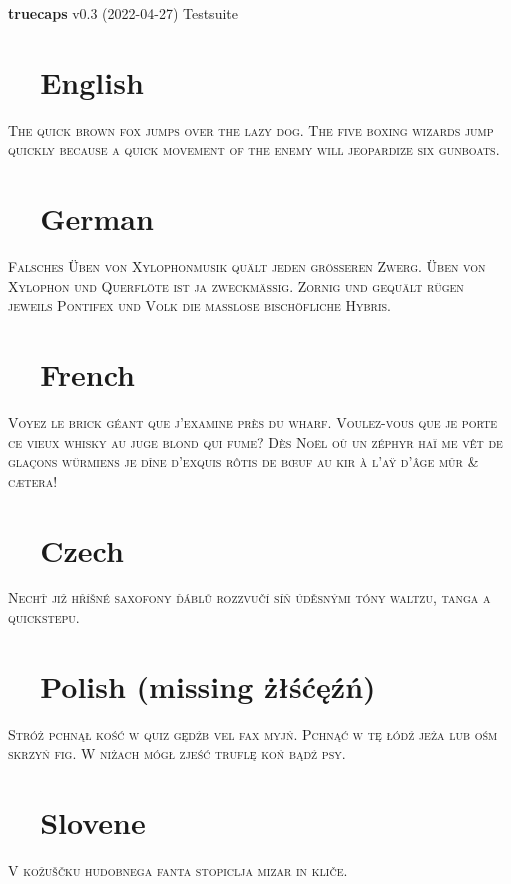 \documentclass{article}
\def\checkno	{\textcolor{red}{\textbf{\ding{55}~~}}}
\def\checkyes	{\textcolor{green}{\textbf{\ding{51}~~}}}
\begin{document}
\hfill{\Large \textbf{truecaps} v0.3 (2022-04-27) Testsuite}

\vspace{-1em}\section*{\checkyes English}
\textsc{The quick brown fox jumps over the lazy dog.
The five boxing wizards jump quickly because 
a quick movement of the enemy will jeopardize six gunboats.}

\vspace{-1em}\section*{\checkyes German}
\noindent\textsc{Falsches Üben von Xylophonmusik quält jeden größeren Zwerg.
Üben von Xylophon und Querflöte ist ja zweckmäßig. 
Zornig und gequält rügen jeweils Pontifex und Volk die maßlose bischöfliche Hybris.}

\vspace{-1em}\section*{\checkyes French}
\noindent\textsc{Voyez le brick géant que j’examine près du wharf.
Voulez-vous que je porte ce vieux whisky au juge blond qui fume\medspace?
Dès Noël où un zéphyr haï me vêt de glaçons würmiens 
je dîne d’exquis rôtis de bœuf au kir à l’aÿ d’âge mûr \& cætera\medspace!}

\vspace{-1em}\section*{\checkyes Czech}
\noindent\textsc{Nechť již hříšné saxofony ďáblů rozzvučí síň úděsnými 
tóny waltzu, tanga a quickstepu.}

\vspace{-1em}\section*{\checkno Polish (missing \string żłśćęźń)}
\noindent\textsc{
Stróż pchnął kość w quiz gędźb vel fax myjń. 
Pchnąć w tę łódź jeża lub ośm skrzyń fig.
W niżach mógł zjeść truflę koń bądź psy.
}

\vspace{-1em}\section*{\checkno Slovene}
\noindent\textsc{
V kožuščku hudobnega fanta stopiclja mizar in kliče.
}
\end{document}
